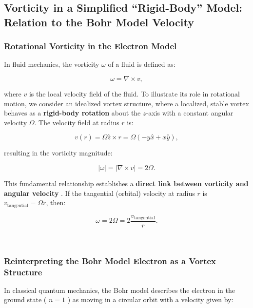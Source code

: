 

\subsection{Vorticity in a Simplified “Rigid-Body” Model: Relation to the Bohr Model Velocity}

\subsubsection*{Rotational Vorticity in the Electron Model}

In fluid mechanics, the vorticity \( \omega \) of a fluid is defined as:

\begin{equation*}
    \omega = \nabla \times v,
\end{equation*}

where \( v \) is the local velocity field of the fluid. To illustrate its role in rotational motion, we consider an idealized vortex structure, where a localized, stable vortex behaves as a \textbf{rigid-body rotation} about the \( z \)-axis with a constant angular velocity \( \Omega \). The velocity field at radius \( r \) is:

\begin{equation*}
    v(r) = \Omega ẑ \times r = \Omega(-yx̂ + xŷ),
\end{equation*}

resulting in the vorticity magnitude:

\begin{equation*}
    |\omega| = |\nabla \times v| = 2\Omega.
\end{equation*}

This fundamental relationship establishes a \textbf{direct link between vorticity and angular velocity} \cite{lamb_hydrodynamics, feynman_qed}. If the tangential (orbital) velocity at radius \( r \) is \( v_\text{tangential} = \Omega r \), then:

\begin{equation*}
    \omega = 2\Omega = 2\frac{v_\text{tangential}}{r}.
\end{equation*}

---

\subsubsection*{Reinterpreting the Bohr Model Electron as a Vortex Structure}

In classical quantum mechanics, the Bohr model describes the electron in the ground state ( \( n = 1 \) ) as moving in a circular orbit with a velocity given by:

